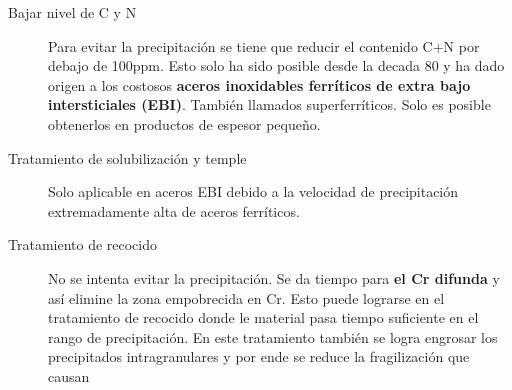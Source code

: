 \begin{description}
	\item[Bajar nivel de C y N]  Para evitar la precipitación se tiene que reducir el contenido C+N por debajo de 100ppm. Esto solo ha sido posible desde la decada 80 y ha dado origen a los costosos \textbf{aceros inoxidables ferríticos de extra bajo intersticiales (EBI)}. También llamados superferríticos. Solo es posible obtenerlos en productos de espesor pequeño.
	\item[Tratamiento de solubilización y temple] Solo aplicable en aceros EBI debido a la velocidad de precipitación extremadamente alta de aceros ferríticos.
	\item[Tratamiento de recocido] No se intenta evitar la precipitación. Se da tiempo para \textbf{el Cr difunda} y así elimine la zona empobrecida en Cr. Esto puede lograrse en el tratamiento de recocido donde le material pasa tiempo suficiente en el rango de precipitación. En este tratamiento 	también se logra engrosar los precipitados intragranulares y por 	ende se reduce la fragilización que causan
\end{description}













